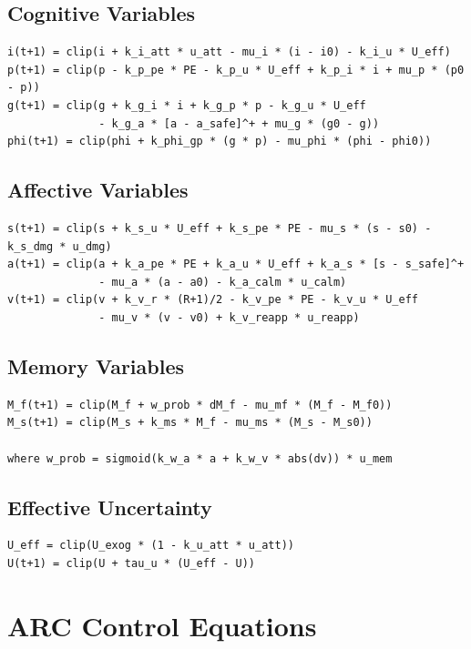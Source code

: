 \documentclass{article}
\begin{document}
\subsection{Cognitive Variables}

\begin{verbatim}
i(t+1) = clip(i + k_i_att * u_att - mu_i * (i - i0) - k_i_u * U_eff)
p(t+1) = clip(p - k_p_pe * PE - k_p_u * U_eff + k_p_i * i + mu_p * (p0 - p))
g(t+1) = clip(g + k_g_i * i + k_g_p * p - k_g_u * U_eff
              - k_g_a * [a - a_safe]^+ + mu_g * (g0 - g))
phi(t+1) = clip(phi + k_phi_gp * (g * p) - mu_phi * (phi - phi0))
\end{verbatim}

\subsection{Affective Variables}

\begin{verbatim}
s(t+1) = clip(s + k_s_u * U_eff + k_s_pe * PE - mu_s * (s - s0) - k_s_dmg * u_dmg)
a(t+1) = clip(a + k_a_pe * PE + k_a_u * U_eff + k_a_s * [s - s_safe]^+
              - mu_a * (a - a0) - k_a_calm * u_calm)
v(t+1) = clip(v + k_v_r * (R+1)/2 - k_v_pe * PE - k_v_u * U_eff
              - mu_v * (v - v0) + k_v_reapp * u_reapp)
\end{verbatim}

\subsection{Memory Variables}

\begin{verbatim}
M_f(t+1) = clip(M_f + w_prob * dM_f - mu_mf * (M_f - M_f0))
M_s(t+1) = clip(M_s + k_ms * M_f - mu_ms * (M_s - M_s0))

where w_prob = sigmoid(k_w_a * a + k_w_v * abs(dv)) * u_mem
\end{verbatim}

\subsection{Effective Uncertainty}

\begin{verbatim}
U_eff = clip(U_exog * (1 - k_u_att * u_att))
U(t+1) = clip(U + tau_u * (U_eff - U))
\end{verbatim}

\section{ARC Control Equations}
\end{document}
